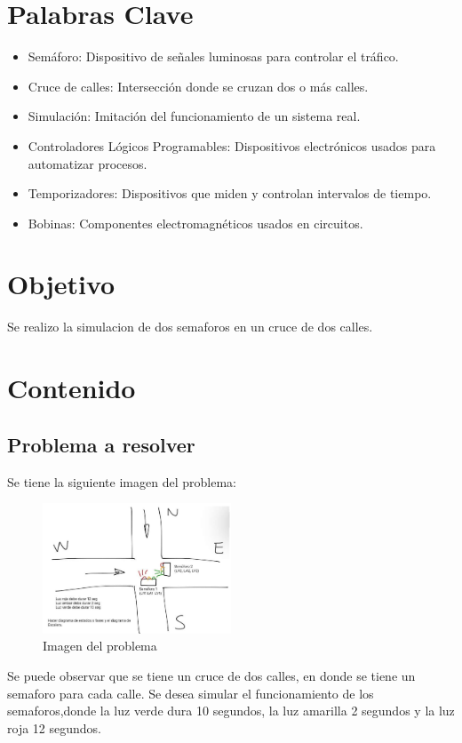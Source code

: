 \documentclass[12pt]{report}
\begin{document}
\tableofcontents
\newpage

\chapter*{Palabras Clave}
  \begin{itemize}
    \item Semáforo: Dispositivo de señales luminosas para controlar el tráfico.
    \item Cruce de calles: Intersección donde se cruzan dos o más calles.
    \item Simulación: Imitación del funcionamiento de un sistema real.
    \item Controladores Lógicos Programables: Dispositivos electrónicos usados para automatizar procesos.
    \item Temporizadores: Dispositivos que miden y controlan intervalos de tiempo.
    \item Bobinas: Componentes electromagnéticos usados en circuitos.
  \end{itemize}



\newpage

\chapter*{Objetivo}
  Se realizo la simulacion de dos semaforos en un cruce de dos calles.
\newpage

\chapter{Contenido}
\section{Problema a resolver}
  Se tiene la siguiente imagen del problema:
  \begin{figure}[H]
    \centering
    \includegraphics[width=0.5\textwidth]{screenshots/problema.png}
    \caption{Imagen del problema}
    \label{fig:imagen}
  \end{figure}
  Se puede observar que se tiene un cruce de dos calles, en donde se tiene un semaforo para cada calle. Se desea simular el funcionamiento de los semaforos,donde la luz verde dura 10 segundos, la luz amarilla 2 segundos y la luz roja 12 segundos.
\end{document}
